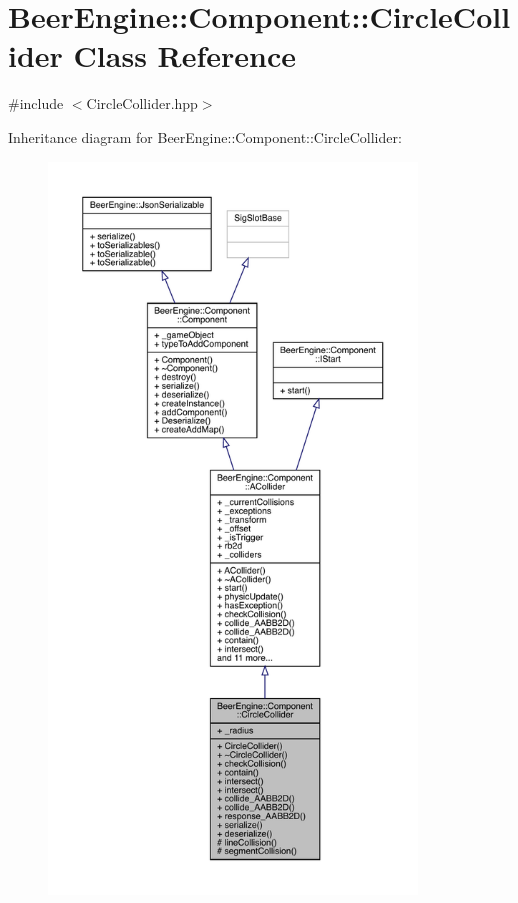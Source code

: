 \hypertarget{class_beer_engine_1_1_component_1_1_circle_collider}{}\section{Beer\+Engine\+:\+:Component\+:\+:Circle\+Collider Class Reference}
\label{class_beer_engine_1_1_component_1_1_circle_collider}


{\ttfamily \#include $<$Circle\+Collider.\+hpp$>$}



Inheritance diagram for Beer\+Engine\+:\+:Component\+:\+:Circle\+Collider\+:\nopagebreak
\begin{figure}[H]
\begin{center}
\leavevmode
\includegraphics[height=550pt]{class_beer_engine_1_1_component_1_1_circle_collider__inherit__graph}
\end{center}
\end{figure}



